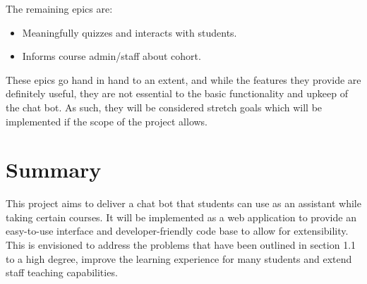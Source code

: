 \documentclass{article}
\begin{document}
The remaining epics are:
\begin{itemize}
  \item Meaningfully quizzes and interacts with students.
  \item Informs course admin/staff about cohort.
\end{itemize}

These epics go hand in hand to an extent, and while the features they provide are definitely useful, they are not essential to the basic functionality and upkeep of the chat bot. As such, they will be considered stretch goals which will be implemented if the scope of the project allows.

\section{Summary}

This project aims to deliver a chat bot that students can use as an assistant while taking certain courses. It will be implemented as a web application to provide an easy-to-use interface and developer-friendly code base to allow for extensibility. This is envisioned to address the problems that have been outlined in section 1.1 to a high degree, improve the learning experience for many students and extend staff teaching capabilities.
\end{document}

